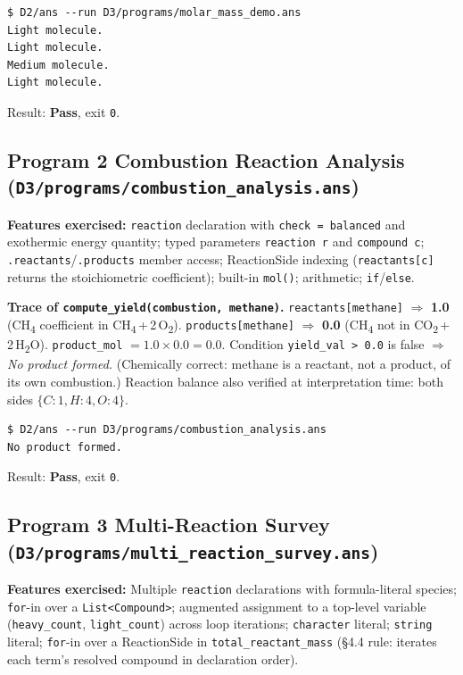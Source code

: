 \documentclass[11pt,a4paper]{article}
\newcommand{\code}[1]{\texttt{#1}}
\newcommand{\file}[1]{{\footnotesize\texttt{#1}}}
\newcommand{\statusok}{\textcolor{anssuccess}{\textbf{Pass}}}
\begin{document}
\begin{lstlisting}[style=terminal]
$ D2/ans --run D3/programs/molar_mass_demo.ans
Light molecule.
Light molecule.
Medium molecule.
Light molecule.
\end{lstlisting}
Result: \statusok, exit \code{0}.

\subsection{Program 2 \textemdash{} Combustion Reaction Analysis
  (\file{D3/programs/combustion\_analysis.ans})}

\textbf{Features exercised:} \code{reaction} declaration with
\code{check = balanced} and exothermic energy quantity; typed parameters
\code{reaction r} and \code{compound c}; \code{.reactants}/\code{.products}
member access; ReactionSide indexing (\code{reactants[c]} returns the
stoichiometric coefficient); built-in \code{mol()}; arithmetic; \code{if}/\code{else}.

\smallskip
\textbf{Trace of \code{compute\_yield(combustion, methane)}.}
\code{reactants[methane]} $\Rightarrow$ \textbf{1.0} (CH\textsubscript{4}
coefficient in CH\textsubscript{4}\,+\,2\,O\textsubscript{2}).
\code{products[methane]} $\Rightarrow$ \textbf{0.0} (CH\textsubscript{4} not
in CO\textsubscript{2}\,+\,2\,H\textsubscript{2}O).
\code{product\_mol} $= 1.0 \times 0.0 = \mathbf{0.0}$.
Condition \code{yield\_val > 0.0} is false $\Rightarrow$ \textit{No product formed.}
(Chemically correct: methane is a reactant, not a product, of its own combustion.)
Reaction balance also verified at interpretation time:
both sides $\{C{:}1, H{:}4, O{:}4\}$.

\begin{lstlisting}[style=terminal]
$ D2/ans --run D3/programs/combustion_analysis.ans
No product formed.
\end{lstlisting}
Result: \statusok, exit \code{0}.

\subsection{Program 3 \textemdash{} Multi-Reaction Survey
  (\file{D3/programs/multi\_reaction\_survey.ans})}

\textbf{Features exercised:} Multiple \code{reaction} declarations with
formula-literal species; \code{for}-in over a \code{List<Compound>}; augmented
assignment to a top-level variable (\code{heavy\_count}, \code{light\_count})
across loop iterations; \code{character} literal; \code{string} literal;
\code{for}-in over a ReactionSide in \code{total\_reactant\_mass} (§4.4 rule:
iterates each term's resolved compound in declaration order).
\end{document}
